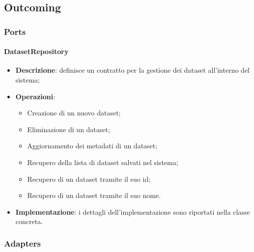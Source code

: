 \subsection{Outcoming}
\subsubsection{Ports}
\paragraph{DatasetRepository}
\begin{itemize}
    \item \textbf{Descrizione}: definisce un contratto per la gestione dei dataset all'interno del sistema;
    \item \textbf{Operazioni}:
    \begin{itemize}
        \item Creazione di un nuovo dataset;
        \item Eliminazione di un dataset;
        \item Aggiornamento dei metadati di un dataset;
        \item Recupero della lista di dataset salvati nel sistema;
        \item Recupero di un dataset tramite il suo id;
        \item Recupero di un dataset tramite il suo nome.
    \end{itemize}
    \item \textbf{Implementazione}: i dettagli dell'implementazione sono riportati nella classe concreta.
\end{itemize}

\subsubsection{Adapters}
